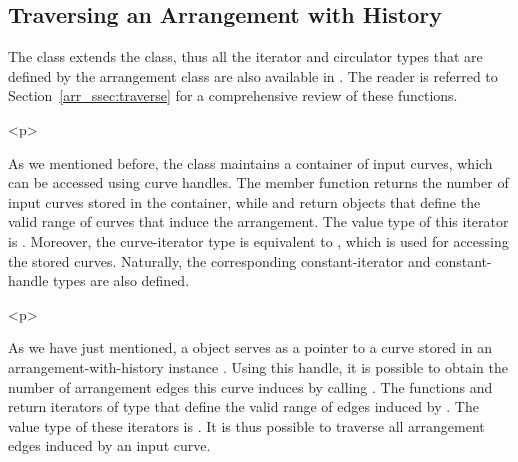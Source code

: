 \subsection{Traversing an Arrangement with History}
\label{arr_ssec:arrwh_traverse}
%
The  class extends the 
class, thus all the iterator and circulator types that are defined by the
arrangement class are also available in .
The reader is referred to Section~\ref{arr_ssec:traverse} for a comprehensive
review of these functions.

\begin{ccHtmlOnly}<p>\end{ccHtmlOnly}
As we mentioned before, the  class maintains
a container of input curves, which can be accessed using curve handles.
The member function  returns the number of input 
curves stored in the container, while  and 
 return 
objects that define the  valid range of curves that induce the arrangement.
The value type of this iterator is . Moreover, the curve-iterator
type is equivalent to  , which
is used for accessing the stored curves. Naturally, the corresponding
constant-iterator and constant-handle types are also defined.

\begin{ccHtmlOnly}<p>\end{ccHtmlOnly}
As we have just mentioned, a  object  serves as
a pointer to a curve stored in an arrangement-with-history instance .
Using this handle, it is possible to obtain the number of arrangement edges
this curve induces by calling .
The functions  and
 return iterators of type
 that define the
valid range of edges induced by . The value type of these iterators
is . It is thus possible to traverse all arrangement
edges induced by an input curve.

